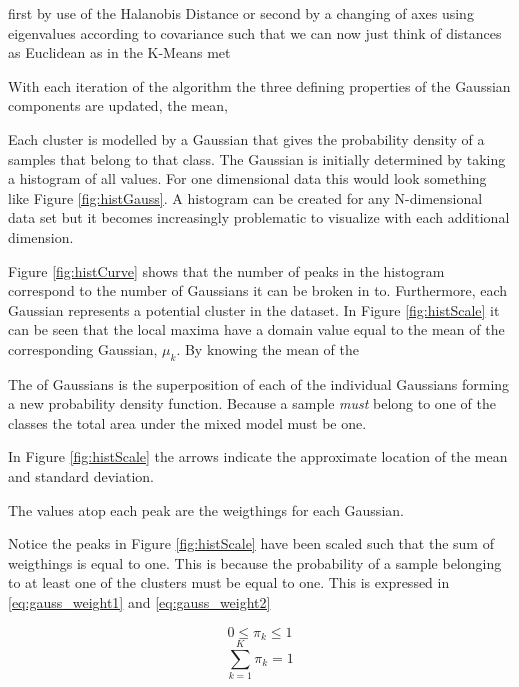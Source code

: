 first by use of the Halanobis Distance or second by a changing of axes using eigenvalues according to covariance such that we can now just think of distances as Euclidean as in the K-Means met

With each iteration of the algorithm the three defining properties of the Gaussian components are updated, the mean, 

Each cluster is modelled by a Gaussian that gives the probability density of a samples that belong to that class. The Gaussian is initially determined by taking a histogram of all values. For one dimensional data this would look something like Figure \ref{fig:histGauss}. A histogram can be created for any N-dimensional data set but it becomes increasingly problematic to visualize with each additional dimension.



Figure \ref{fig:histCurve} shows that the number of peaks in the histogram correspond to the number of Gaussians it can be broken in to. Furthermore, each Gaussian represents a potential cluster in the dataset. In Figure \ref{fig:histScale} it can be seen that the local maxima have a domain value equal to the mean of the corresponding Gaussian, $\mu_k$. By knowing the mean of the

The  of Gaussians is the superposition of each of the individual Gaussians forming a new probability density function. Because a sample \emph{must} belong to one of the classes the total area under the mixed model must be one. 

In Figure \ref{fig:histScale} the arrows indicate the approximate location of the mean and standard deviation. 

The values atop each peak are the weigthings for each Gaussian.


Notice the peaks in Figure \ref{fig:histScale} have been scaled such that the sum of weigthings is equal to one. This is because the probability of a sample belonging to at least one of the clusters must be equal to one. This is expressed in \ref{eq:gauss_weight1} and \ref{eq:gauss_weight2}

\begin{equation}
    0\leq \pi_k \leq 1
\label{eq:gauss_weight1}
\end{equation}
\begin{equation}
    \sum_{k=1}^{K}\pi_k = 1
\label{eq:gauss_weight2}
\end{equation}






